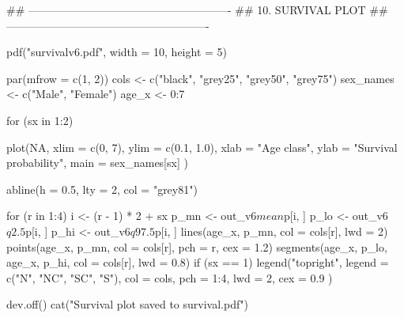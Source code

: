 
## -------------------------------------------------------
## 10.  SURVIVAL PLOT
## -------------------------------------------------------

pdf("survivalv6.pdf", width = 10, height = 5)

par(mfrow = c(1, 2))
cols <- c("black", "grey25", "grey50", "grey75")
sex_names <- c("Male", "Female")
age_x <- 0:7

for (sx in 1:2) {

plot(NA,
xlim = c(0, 7), ylim = c(0.1, 1.0),
xlab = "Age class", ylab = "Survival probability",
main = sex_names[sx]
)

abline(h = 0.5, lty = 2, col = "grey81")

for (r in 1:4) {
        i <- (r - 1) * 2 + sx
        p_mn <- out_v6$mean$p[i, ]
        p_lo <- out_v6$q2.5$p[i, ]
        p_hi <- out_v6$q97.5$p[i, ]
        lines(age_x, p_mn, col = cols[r], lwd = 2)
        points(age_x, p_mn, col = cols[r], pch = r, cex = 1.2)
        segments(age_x, p_lo, age_x, p_hi, col = cols[r], lwd = 0.8)
    }
if (sx == 1) {
        legend("topright",
        legend = c("N", "NC", "SC", "S"),
        col = cols, pch = 1:4, lwd = 2, cex = 0.9
        )
    }
}


dev.off()
cat("Survival plot saved to survival.pdf\n")
